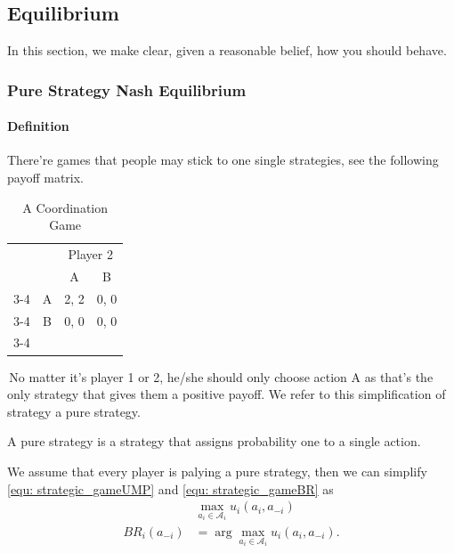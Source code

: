 \subsection{Equilibrium}
In this section, we make clear, given a reasonable belief, how you should behave. 

\subsubsection{Pure Strategy Nash Equilibrium}
\paragraph{Definition}
There're games that people may stick to one single strategies, see the following payoff matrix.
\begin{table}[h!]
\centering
\begin{tabular}{cccc}
                          &                        & \multicolumn{2}{c}{Player 2}                          \\
                          &                        & A                         & B                         \\ \cline{3-4} 
\multirow{2}{*}{Player 1} & \multicolumn{1}{c|}{A} & \multicolumn{1}{c|}{2, 2} & \multicolumn{1}{c|}{0, 0} \\ \cline{3-4} 
                          & \multicolumn{1}{c|}{B} & \multicolumn{1}{c|}{0, 0} & \multicolumn{1}{c|}{0, 0} \\ \cline{3-4} 
\end{tabular}
\caption{A Coordination Game}
\label{tab:A Coordination Game}
\end{table}
\,No matter it's player 1 or 2, he/she should only choose action A as that's the only strategy that gives them a positive payoff. We refer to this simplification of strategy a pure strategy.
\begin{definition}
    A pure strategy is a strategy that assigns probability one to a single action.
\end{definition}

We assume that every player is palying a pure strategy, then we can simplify \eqref{equ: strategic_gameUMP} and \eqref{equ: strategic_gameBR} as 
$$\begin{aligned}
    &\max_{a_i\in \mathcal{A}_i} u_i(a_i,a_{-i})\\
    BR_i(a_{-i})&= \arg\max_{a_i\in \mathcal{A}_i} u_i(a_i,a_{-i}).
\end{aligned}$$


